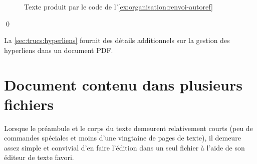 \begin{exemple}
  \begin{figure}
    \centering
    \caption{Texte produit par le code de
      l'\autoref{ex:organisation:renvoi-autoref}}
    \label{fig:organisation:renvoi-autoref}
  \end{figure}
  \qed
\end{exemple}

La \autoref{sec:trucs:hyperliens} fournit des détails
additionnels sur la gestion des hyperliens dans un document PDF.


\section{Document contenu dans plusieurs fichiers}
\label{sec:organisation:include}

Lorsque le préambule et le corps du texte demeurent relativement
courts (peu de commandes spéciales et moins d'une vingtaine de pages
de texte), il demeure assez simple et convivial d'en faire l'édition
dans un seul fichier à l'aide de son éditeur de texte favori.

